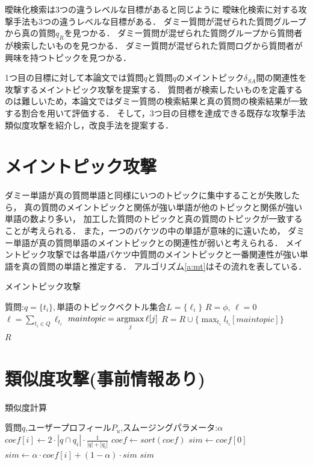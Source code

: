 \documentclass[master]{suribt}
\theoremstyle{definition}
\newcommand{\argmax}{\mathop{\rm argmax}\limits}
\begin{document}
 曖昧化検索は3つの違うレベルな目標があると同じように
 曖昧化検索に対する攻撃手法も3つの違うレベルな目標がある．
 ダミー質問が混ぜられた質問グループから真の質問$q_R$を見つかる．
 ダミー質問が混ぜられた質問グループから質問者が検索したいものを見つかる．
 ダミー質問が混ぜられた質問ログから質問者が興味を持つトピックを見つかる．

 1つ目の目標に対して本論文では質問$q$と質問$q$のメイントピック$\delta_{SA}$間の関連性を攻撃するメイントピック攻撃を提案する．
 質問者が検索したいものを定義するのは難しいため，本論文ではダミー質問の検索結果と真の質問の検索結果が一致する割合を用いて評価する．
 そして，3つ目の目標を達成できる既存な攻撃手法類似度攻撃\cite{simattack2016}を紹介し，改良手法を提案する．

 \section{メイントピック攻撃}

 ダミー単語が真の質問単語と同様にいつのトピックに集中することが失敗したら，
 真の質問のメイントピックと関係が強い単語が他のトピックと関係が強い単語の数より多い，
 加工した質問のトピックと真の質問のトピックが一致することが考えられる．
 また，一つのバケツの中の単語が意味的に遠いため，
 ダミー単語が真の質問単語のメイントピックとの関連性が弱いと考えられる．
 メイントピック攻撃では各単語バケツ中質問のメイントピックと一番関連性が強い単語を真の質問の単語と推定する．
 アルゴリズム\ref{a:mt}はその流れを表している．

 \begin{algorithm}
 \caption{メイントピック攻撃}
 \begin{algorithmic}[1]
  \Require 質問:$q=\{t_i\},$単語のトピックベクトル集合$L=\{\ell_i\}$
  \State $R=\phi, \, \ell=0$
  \State $\ell=\sum_{t_i \in Q}\ell_{t_i}$
  \State $maintopic = \argmax_j \ell[j]$
  \State $R=R \cup \{\max_{t_i}l_{t_i}[maintopic]\}$
  \EndFor　\\
  \Return $R$
 \end{algorithmic}
 \label{a:mt}
 \end{algorithm}

 \section{類似度攻撃\cite{simattack2016}(事前情報あり)}
 \begin{algorithm}
 \caption{類似度計算}
 \begin{algorithmic}[1]
  \Require 質問$q$,ユーザープロフィール$P_u$,スムージングパラメータ:$\alpha$
  \State $coef[i] \leftarrow 2 \cdot |q \cap q_i| \cdot \frac{1}{|q|+|q_i|}$
  \EndFor
  \State $coef \gets sort(coef)$
  \State $sim \gets coef[0]$
  \State $sim \gets \alpha \cdot coef[i] + (1 - \alpha) \cdot sim$
  \EndFor
  \Ensure $sim$
 \end{algorithmic}
 \end{algorithm}
 
\end{document}
